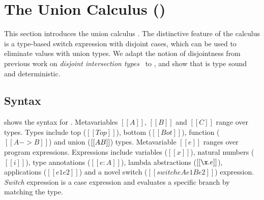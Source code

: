 \section{The Union Calculus (\name)}
\label{sec:union}

This section introduces the union calculus \name. The distinctive feature
of the \name calculus is a type-based switch expression with disjoint
cases, which can be used to eliminate values with union types.
We adapt the notion of disjointness from previous work on
\emph{disjoint intersection types}~\cite{oliveira2016disjoint} to \name, and show that \name is type
sound and deterministic.


\subsection{Syntax}\label{sec:union:syntax}
 shows the syntax for \cal. Metavariables
$[[A]]$, $[[B]]$ and $[[C]]$ range over types.  Types include top ($[[Top]]$),
bottom ($[[Bot]]$), function ($[[A -> B]]$) and union ($[[A \/ B]]$)
types. Metavariable $[[e]]$ ranges over program
expressions. Expressions include variables ($[[x]]$), natural numbers
($[[i]]$), type annotations ($[[e:A]]$), lambda abstractions
($[[\x.e]]$), applications ($[[e1 e2]]$) and a novel switch ($[[switch
    e A e1 B e2]]$) expression. \emph{Switch} expression is a case
expression and evaluates a specific branch by matching the
type.

